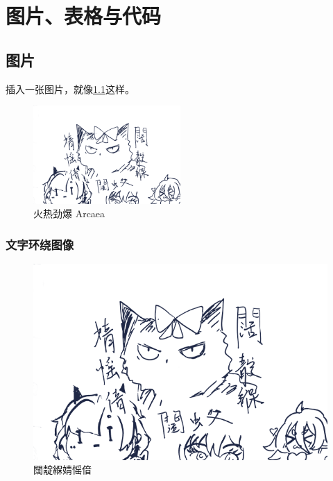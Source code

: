 \chapter{图片、表格与代码}

\section{图片}

插入一张图片，就像\cref{fig:arcaea}这样。

\begin{figure}[htbp]
    \centering
    \includegraphics[width=0.5\textwidth]{test.png}
    \caption{火热劲爆 Arcaea}
    \label{fig:arcaea}
\end{figure}
\zhlipsum[3][name=xiangyu]

\subsection{文字环绕图像}
\begin{figure}
    \label{fig:arcaeaedge}
    \includegraphics[width=.15\textwidth]{test.png}
    \caption{闊靛緥婧愮偣}
\end{figure}
\zhlipsum[2][name=xiangyu]

    
